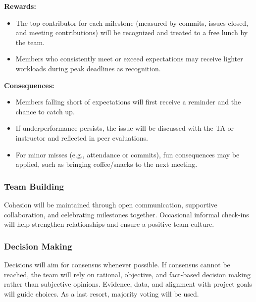 \documentclass{article}
\begin{document}
\vspace{0.5em}
\noindent\textbf{Rewards:}
\begin{itemize}
    \item The top contributor for each milestone (measured by commits, issues closed, and meeting contributions) will be recognized and treated to a free lunch by the team.
    \item Members who consistently meet or exceed expectations may receive lighter workloads during peak deadlines as recognition.
\end{itemize}

\vspace{0.5em}
\noindent\textbf{Consequences:}
\begin{itemize}
    \item Members falling short of expectations will first receive a reminder and the chance to catch up.
    \item If underperformance persists, the issue will be discussed with the TA or instructor and reflected in peer evaluations.
    \item For minor misses (e.g., attendance or commits), fun consequences may be applied, such as bringing coffee/snacks to the next meeting.
\end{itemize}
\subsubsection*{Team Building}

Cohesion will be maintained through open communication, supportive collaboration, and celebrating milestones together. Occasional informal check-ins will help strengthen relationships and ensure a positive team culture.

\subsubsection*{Decision Making}

Decisions will aim for consensus whenever possible. If consensus cannot be reached, the team will rely on rational, objective, and fact-based decision making rather than subjective opinions. Evidence, data, and alignment with project goals will guide choices. As a last resort, majority voting will be used.
\end{document}
